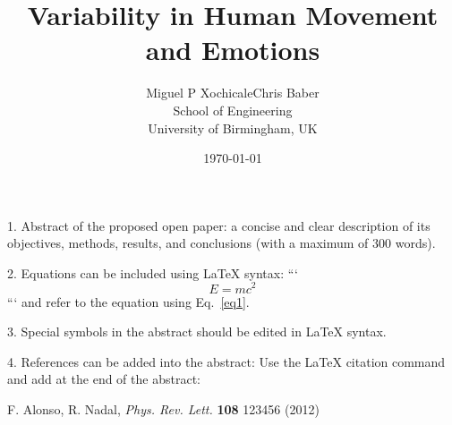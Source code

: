 \documentclass[12pt]{article}
\author{Miguel P Xochicale\qquad Chris Baber\\
School of Engineering\\
University of Birmingham, UK}
\title{Variability in Human Movement and Emotions} %
\date{\today}
\begin{document}
\maketitle


1. Abstract of the proposed open paper: a concise and clear description of its
objectives, methods, results, and conclusions (with a maximum of 300 words).





2. Equations can be included using LaTeX syntax:
```
\begin{equation}\label{eq1}
E=mc^2
\end{equation}
```
and refer to the equation using Eq.~\ref{eq1}.

3. Special symbols in the abstract should be edited in LaTeX syntax.

4. References can be added into the abstract:
   Use the LaTeX citation command \cite{key} and add at
   the end of the abstract:


\begin{thebibliography}{10}
F. Alonso, R. Nadal, {\it Phys. Rev. Lett.} {\bf 108} 123456 (2012)
\end{thebibliography}
\end{document}
